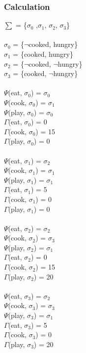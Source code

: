 \documentclass[11pt]{article}
\begin{document}
	\subsubsection{Calculation}\label{par:p303}
	$\sum$ = \{$\sigma_{0}$ ,$\sigma_{1}$, $\sigma_{2}$, $\sigma_{3}$\}\\
	\\
	$\sigma_{0}$ = \{$\neg$cooked, hungry\}\\
	$\sigma_{1}$ = \{cooked, hungry\}\\
	$\sigma_{2}$ = \{$\neg$cooked, $\neg$hungry\}\\
	$\sigma_{3}$ = \{cooked, $\neg$hungry\}\\
	\\
	\(  \Psi  \)(eat, $\sigma_{0}$) = $\sigma_{0}$\\
	\(  \Psi  \)(cook, $\sigma_{0}$) = $\sigma_{1}$\\
	\(  \Psi  \)(play, $\sigma_{0}$) = $\sigma_{0}$\\
	\(\Gamma\)(eat, $\sigma_{0}$) = 0\\
	\(\Gamma\)(cook, $\sigma_{0}$) = 15\\
	\(\Gamma\)(play, $\sigma_{0}$) = 0\\
	\\
	\(  \Psi  \)(eat, $\sigma_{1}$) = $\sigma_{2}$\\
	\(  \Psi  \)(cook, $\sigma_{1}$) = $\sigma_{1}$\\
	\(  \Psi  \)(play, $\sigma_{1}$) = $\sigma_{1}$\\
	\(\Gamma\)(eat, $\sigma_{1}$) = 5\\
	\(\Gamma\)(cook, $\sigma_{1}$) = 0\\
	\(\Gamma\)(play, $\sigma_{1}$) = 0\\
	\\
	\(  \Psi  \)(eat, $\sigma_{2}$) = $\sigma_{2}$\\
	\(  \Psi  \)(cook, $\sigma_{2}$) = $\sigma_{3}$\\
	\(  \Psi  \)(play, $\sigma_{2}$) = $\sigma_{1}$\\
	\(\Gamma\)(eat, $\sigma_{2}$) = 0\\
	\(\Gamma\)(cook, $\sigma_{2}$) = 15\\
	\(\Gamma\)(play, $\sigma_{2}$) = 20\\
	\\
	\(  \Psi  \)(eat, $\sigma_{3}$) = $\sigma_{2}$\\
	\(  \Psi  \)(cook, $\sigma_{3}$) = $\sigma_{3}$\\
	\(  \Psi  \)(play, $\sigma_{3}$) = $\sigma_{1}$\\
	\(\Gamma\)(eat, $\sigma_{3}$) = 5\\
	\(\Gamma\)(cook, $\sigma_{3}$) = 0\\
	\(\Gamma\)(play, $\sigma_{3}$) = 20\\
	\\
\end{document}
